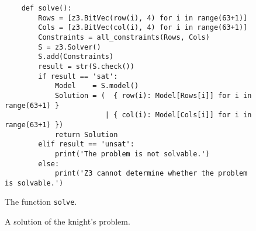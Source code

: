 \begin{figure}[!ht]
\centering
\begin{verbatim}
    def solve():
        Rows = [z3.BitVec(row(i), 4) for i in range(63+1)]
        Cols = [z3.BitVec(col(i), 4) for i in range(63+1)]
        Constraints = all_constraints(Rows, Cols)
        S = z3.Solver()
        S.add(Constraints)
        result = str(S.check())
        if result == 'sat':
            Model    = S.model()
            Solution = (  { row(i): Model[Rows[i]] for i in range(63+1) } 
                        | { col(i): Model[Cols[i]] for i in range(63+1) })
            return Solution
        elif result == 'unsat':
            print('The problem is not solvable.')
        else:
            print('Z3 cannot determine whether the problem is solvable.')
\end{verbatim}
\vspace*{-0.3cm}
\caption{The function \texttt{solve}.}
\label{fig:Knight's Tour with Z3.ipynb-2}
\end{figure}

\begin{figure}[!ht]
  \centering
  \caption{A solution of the knight's problem.}
  \label{fig:knights-problem.png}
\end{figure}

